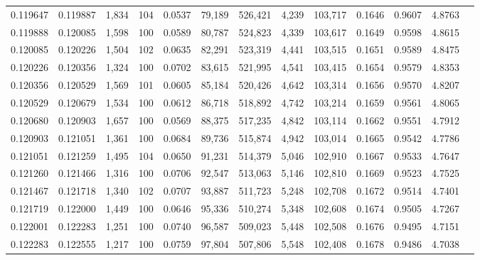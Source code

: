 \begin{tabular}{rrrrrrrrrrrrr}
0.119647 & 0.119887 & 1,834 & 104 &                                     0.0537 &  79,189 & 526,421 &   4,239 & 103,717 & 0.1646 & 0.9607 & 4.8763 \\
0.119888 & 0.120085 & 1,598 & 100 &                                     0.0589 &  80,787 & 524,823 &   4,339 & 103,617 & 0.1649 & 0.9598 & 4.8615 \\
0.120085 & 0.120226 & 1,504 & 102 &                                     0.0635 &  82,291 & 523,319 &   4,441 & 103,515 & 0.1651 & 0.9589 & 4.8475 \\
0.120226 & 0.120356 & 1,324 & 100 &                                     0.0702 &  83,615 & 521,995 &   4,541 & 103,415 & 0.1654 & 0.9579 & 4.8353 \\
0.120356 & 0.120529 & 1,569 & 101 &                                     0.0605 &  85,184 & 520,426 &   4,642 & 103,314 & 0.1656 & 0.9570 & 4.8207 \\
0.120529 & 0.120679 & 1,534 & 100 &                                     0.0612 &  86,718 & 518,892 &   4,742 & 103,214 & 0.1659 & 0.9561 & 4.8065 \\
0.120680 & 0.120903 & 1,657 & 100 &                                     0.0569 &  88,375 & 517,235 &   4,842 & 103,114 & 0.1662 & 0.9551 & 4.7912 \\
0.120903 & 0.121051 & 1,361 & 100 &                                     0.0684 &  89,736 & 515,874 &   4,942 & 103,014 & 0.1665 & 0.9542 & 4.7786 \\
0.121051 & 0.121259 & 1,495 & 104 &                                     0.0650 &  91,231 & 514,379 &   5,046 & 102,910 & 0.1667 & 0.9533 & 4.7647 \\
0.121260 & 0.121466 & 1,316 & 100 &                                     0.0706 &  92,547 & 513,063 &   5,146 & 102,810 & 0.1669 & 0.9523 & 4.7525 \\
0.121467 & 0.121718 & 1,340 & 102 &                                     0.0707 &  93,887 & 511,723 &   5,248 & 102,708 & 0.1672 & 0.9514 & 4.7401 \\
0.121719 & 0.122000 & 1,449 & 100 &                                     0.0646 &  95,336 & 510,274 &   5,348 & 102,608 & 0.1674 & 0.9505 & 4.7267 \\
0.122001 & 0.122283 & 1,251 & 100 &                                     0.0740 &  96,587 & 509,023 &   5,448 & 102,508 & 0.1676 & 0.9495 & 4.7151 \\
0.122283 & 0.122555 & 1,217 & 100 &                                     0.0759 &  97,804 & 507,806 &   5,548 & 102,408 & 0.1678 & 0.9486 & 4.7038 \\

\end{tabular}
